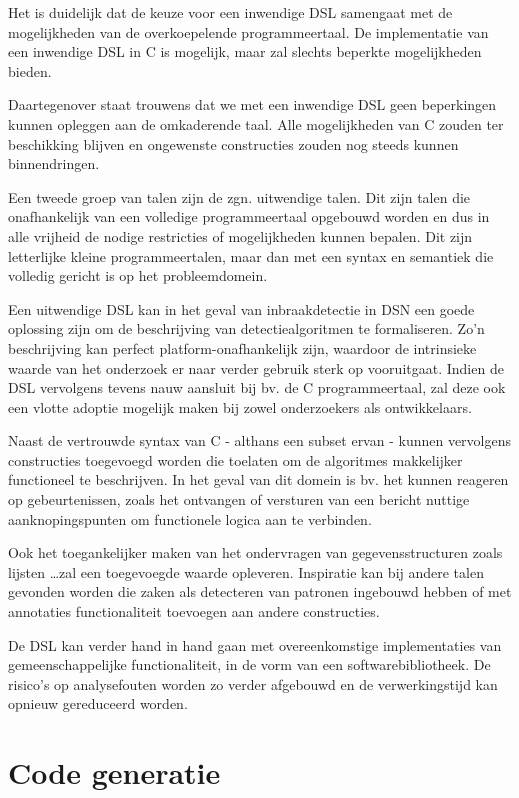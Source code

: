 Het is duidelijk dat de keuze voor een inwendige DSL samengaat met de
mogelijkheden van de overkoepelende programmeertaal. De implementatie van een
inwendige DSL in C is mogelijk, maar zal slechts beperkte mogelijkheden bieden.

Daartegenover staat trouwens dat we met een inwendige DSL geen beperkingen
kunnen opleggen aan de omkaderende taal. Alle mogelijkheden van C zouden ter
beschikking blijven en ongewenste constructies zouden nog steeds kunnen
binnendringen.

Een tweede groep van talen zijn de zgn. uitwendige talen. Dit zijn talen die
onafhankelijk van een volledige programmeertaal opgebouwd worden en dus in alle
vrijheid de nodige restricties of mogelijkheden kunnen bepalen. Dit zijn
letterlijke kleine programmeertalen, maar dan met een syntax en semantiek die
volledig gericht is op het probleemdomein.

Een uitwendige DSL kan in het geval van inbraakdetectie in DSN een goede
oplossing zijn om de beschrijving van detectiealgoritmen te formaliseren. Zo'n
beschrijving kan perfect platform-onafhankelijk zijn, waardoor de intrinsieke
waarde van het onderzoek er naar verder gebruik sterk op vooruitgaat. Indien de
DSL vervolgens tevens nauw aansluit bij bv. de C programmeertaal, zal deze ook
een vlotte adoptie mogelijk maken bij zowel onderzoekers als ontwikkelaars.

Naast de vertrouwde syntax van C - althans een subset ervan - kunnen vervolgens
constructies toegevoegd worden die toelaten om de algoritmes makkelijker
functioneel te beschrijven. In het geval van dit domein is bv. het kunnen
reageren op gebeurtenissen, zoals het ontvangen of versturen van een bericht
nuttige aanknopingspunten om functionele logica aan te verbinden.

Ook het toegankelijker maken van het ondervragen van gegevensstructuren zoals
lijsten \dots zal een toegevoegde waarde opleveren. Inspiratie kan bij andere
talen gevonden worden die zaken als detecteren van patronen ingebouwd hebben of
met annotaties functionaliteit toevoegen aan andere constructies.

De DSL kan verder hand in hand gaan met overeenkomstige implementaties van
gemeenschappelijke functionaliteit, in de vorm van een softwarebibliotheek. De
risico's op analysefouten worden zo verder afgebouwd en de verwerkingstijd kan
opnieuw gereduceerd worden.

\section{Code generatie}
\label{section:solution-codegen}

